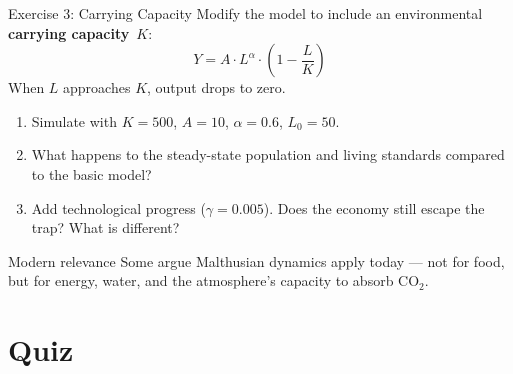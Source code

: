 \documentclass[aspectratio=169, 10pt]{beamer}
\begin{document}
\begin{frame}{Exercise 3: Carrying Capacity}
Modify the model to include an environmental
\textbf{carrying capacity}~$K$:
\[
  Y = A \cdot L^\alpha \cdot \left(1 - \frac{L}{K}\right)
\]
When $L$ approaches $K$, output drops to zero.
\vspace{0.5em}
\begin{enumerate}
  \item Simulate with $K = 500$, $A = 10$, $\alpha = 0.6$,
        $L_0 = 50$.
  \item What happens to the steady-state population and living
        standards compared to the basic model?
  \item Add technological progress ($\gamma = 0.005$).
        Does the economy still escape the trap? What is different?
\end{enumerate}
\vspace{0.3em}
\begin{alertblock}{Modern relevance}
  Some argue Malthusian dynamics apply today --- not for food, but for
  energy, water, and the atmosphere's capacity to absorb CO$_2$.
\end{alertblock}
\end{frame}

\section{Quiz}
\end{document}
